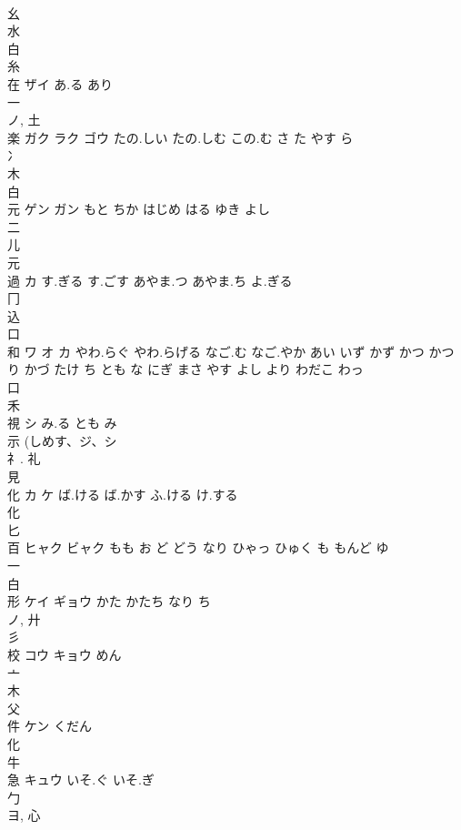 \documentclass[8pt]{extreport}
\begin{document}
\begin{CJK}{UTF8}{min}
\\	幺 
\\	水 
\\	白 
\\	糸 
\\	在	ザイ	あ.る あり	
\\	一 
\\	ノ, 土 
\\	楽	ガク ラク ゴウ	たの.しい たの.しむ この.む さ た やす ら	
\\	冫 
\\	木 
\\	白 
\\	元	ゲン ガン	もと ちか はじめ はる ゆき よし	
\\	二 
\\	儿 
\\	元 
\\	過	カ	す.ぎる す.ごす あやま.つ あやま.ち よ.ぎる	
\\	冂 
\\	込 
\\	口 
\\	和	ワ オ カ	やわ.らぐ やわ.らげる なご.む なご.やか あい いず かず かつ かつり かづ たけ ち とも な にぎ まさ やす よし より わだこ わっ	
\\	口 
\\	禾 
\\	視	シ	み.る とも み	
\\	示 (しめす、ジ、シ 
\\	礻.			礼 
\\	見 
\\	化	カ ケ	ば.ける ば.かす ふ.ける け.する	
\\	化 
\\	匕 
\\	百	ヒャク ビャク	もも お ど どう なり ひゃっ ひゅく も もんど ゆ	
\\	一 
\\	白 
\\	形	ケイ ギョウ	かた かたち なり ち	
\\	ノ, 廾 
\\	彡 
\\	校	コウ キョウ	めん	
\\	亠 
\\	木 
\\	父 
\\	件	ケン	くだん	
\\	化 
\\	牛 
\\	急	キュウ	いそ.ぐ いそ.ぎ	
\\	勹 
\\	ヨ, 心 

\end{CJK}
\end{document}
